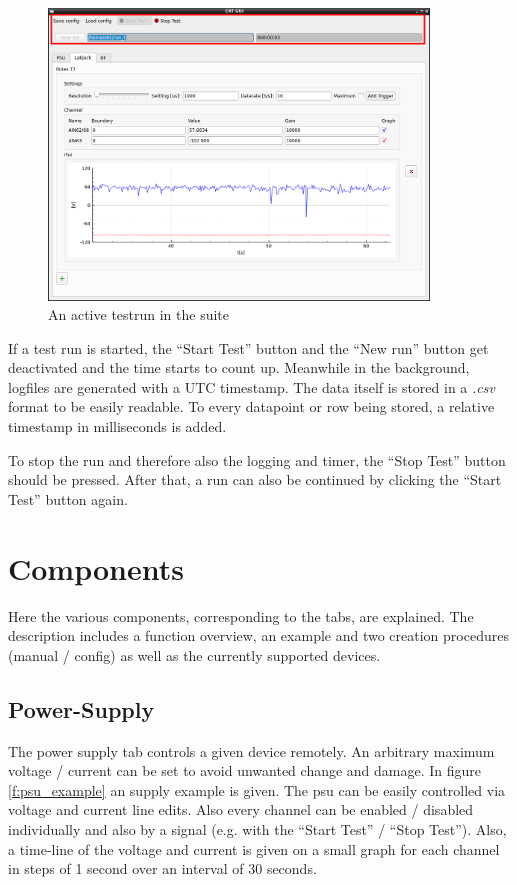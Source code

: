 \documentclass[10pt,a4paper]{article}
\begin{document}
	\begin{figure}[H]
\centering
\includegraphics[width=0.9\textwidth]{./4_Testrun.png}
\caption{An active testrun in the suite}
	\end{figure}
	
	If a test run is started, the \enquote{Start Test} button and the \enquote{New run} button get deactivated and the time starts to count up. Meanwhile in the background, logfiles are generated with a UTC timestamp. The data itself is stored in a \textit{.csv} format to be easily readable. To every datapoint or row being stored, a relative timestamp in milliseconds is added.
	
	\bigbreak
	
	To stop the run and therefore also the logging and timer, the \enquote{Stop Test} button should be pressed. After that, a run can also be continued by clicking the \enquote{Start Test} button again.	
	
\newpage
	
\section{Components}
Here the various components, corresponding to the tabs, are explained. The description includes a function overview, an example and two creation procedures (manual / config) as well as the currently supported devices.

	\subsection{Power-Supply}
	The power supply tab controls a given device remotely. An arbitrary maximum voltage / current can be set to avoid unwanted change and damage. In figure \eqref{f:psu_example} an supply example is given. The psu can be easily controlled via voltage and current line edits. Also every channel can be enabled / disabled individually and also by a signal (e.g. with the \enquote{Start Test} / \enquote{Stop Test}). Also, a time-line of the voltage and current is given on a small graph for each channel in steps of 1 second over an interval of 30 seconds. 	
	
\end{document}
